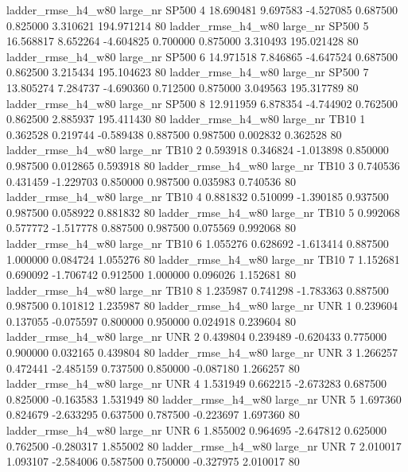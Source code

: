  ladder_rmse_h4_w80   large_nr    SP500                 4 18.690481  9.697583  -4.527085 0.687500 0.825000  3.310621  194.971214 80
 ladder_rmse_h4_w80   large_nr    SP500                 5 16.568817  8.652264  -4.604825 0.700000 0.875000  3.310493  195.021428 80
 ladder_rmse_h4_w80   large_nr    SP500                 6 14.971518  7.846865  -4.647524 0.687500 0.862500  3.215434  195.104623 80
 ladder_rmse_h4_w80   large_nr    SP500                 7 13.805274  7.284737  -4.690360 0.712500 0.875000  3.049563  195.317789 80
 ladder_rmse_h4_w80   large_nr    SP500                 8 12.911959  6.878354  -4.744902 0.762500 0.862500  2.885937  195.411430 80
 ladder_rmse_h4_w80   large_nr     TB10                 1  0.362528  0.219744  -0.589438 0.887500 0.987500  0.002832    0.362528 80
 ladder_rmse_h4_w80   large_nr     TB10                 2  0.593918  0.346824  -1.013898 0.850000 0.987500  0.012865    0.593918 80
 ladder_rmse_h4_w80   large_nr     TB10                 3  0.740536  0.431459  -1.229703 0.850000 0.987500  0.035983    0.740536 80
 ladder_rmse_h4_w80   large_nr     TB10                 4  0.881832  0.510099  -1.390185 0.937500 0.987500  0.058922    0.881832 80
 ladder_rmse_h4_w80   large_nr     TB10                 5  0.992068  0.577772  -1.517778 0.887500 0.987500  0.075569    0.992068 80
 ladder_rmse_h4_w80   large_nr     TB10                 6  1.055276  0.628692  -1.613414 0.887500 1.000000  0.084724    1.055276 80
 ladder_rmse_h4_w80   large_nr     TB10                 7  1.152681  0.690092  -1.706742 0.912500 1.000000  0.096026    1.152681 80
 ladder_rmse_h4_w80   large_nr     TB10                 8  1.235987  0.741298  -1.783363 0.887500 0.987500  0.101812    1.235987 80
 ladder_rmse_h4_w80   large_nr      UNR                 1  0.239604  0.137055  -0.075597 0.800000 0.950000  0.024918    0.239604 80
 ladder_rmse_h4_w80   large_nr      UNR                 2  0.439804  0.239489  -0.620433 0.775000 0.900000  0.032165    0.439804 80
 ladder_rmse_h4_w80   large_nr      UNR                 3  1.266257  0.472441  -2.485159 0.737500 0.850000 -0.087180    1.266257 80
 ladder_rmse_h4_w80   large_nr      UNR                 4  1.531949  0.662215  -2.673283 0.687500 0.825000 -0.163583    1.531949 80
 ladder_rmse_h4_w80   large_nr      UNR                 5  1.697360  0.824679  -2.633295 0.637500 0.787500 -0.223697    1.697360 80
 ladder_rmse_h4_w80   large_nr      UNR                 6  1.855002  0.964695  -2.647812 0.625000 0.762500 -0.280317    1.855002 80
 ladder_rmse_h4_w80   large_nr      UNR                 7  2.010017  1.093107  -2.584006 0.587500 0.750000 -0.327975    2.010017 80
